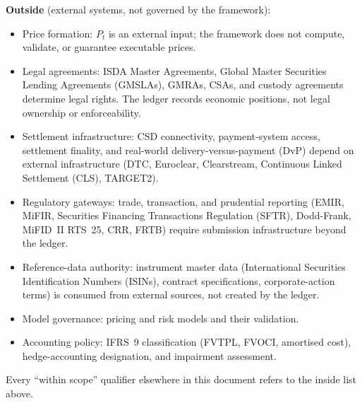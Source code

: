 \medskip
\noindent\textbf{Outside} (external systems, not governed by the framework):
\begin{itemize}[nosep]
\item Price formation: $P_t$ is an external input; the framework does not compute, validate, or guarantee executable prices.
\item Legal agreements: ISDA Master Agreements, Global Master Securities Lending Agreements (GMSLAs), GMRAs, CSAs, and custody agreements determine legal rights. The ledger records economic positions, not legal ownership or enforceability.
\item Settlement infrastructure: CSD connectivity, payment-system access, settlement finality, and real-world delivery-versus-payment (DvP) depend on external infrastructure (DTC, Euroclear, Clearstream, Continuous Linked Settlement (CLS), TARGET2).
\item Regulatory gateways: trade, transaction, and prudential reporting (EMIR, MiFIR, Securities Financing Transactions Regulation (SFTR), Dodd-Frank, MiFID~II RTS~25, CRR, FRTB) require submission infrastructure beyond the ledger.
\item Reference-data authority: instrument master data (International Securities Identification Numbers (ISINs), contract specifications, corporate-action terms) is consumed from external sources, not created by the ledger.
\item Model governance: pricing and risk models and their validation.
\item Accounting policy: IFRS~9 classification (FVTPL, FVOCI, amortised cost), hedge-accounting designation, and impairment assessment.
\end{itemize}

\noindent Every ``within scope'' qualifier elsewhere in this document refers to the inside list above.
